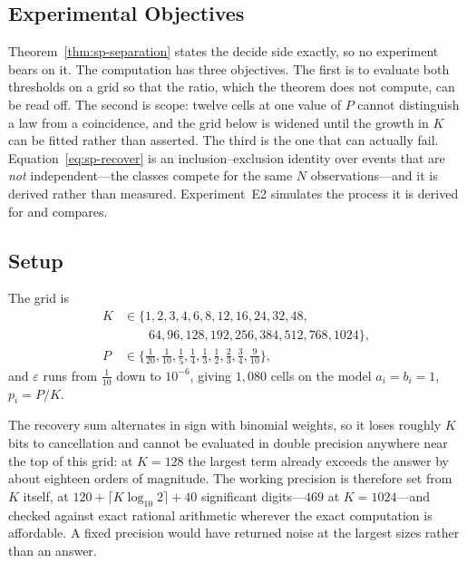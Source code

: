 \documentclass[conference]{IEEEtran}
\theoremstyle{definition}
\begin{document}
\subsection{Experimental Objectives}

Theorem~\ref{thm:sp-separation} states the decide side exactly, so no experiment bears on it. The
computation has three objectives. The first is to evaluate both thresholds on a grid so that
the ratio, which the theorem does not compute, can be read off. The second is scope: twelve
cells at one value of $P$ cannot distinguish a law from a coincidence, and the grid below is
widened until the growth in $K$ can be fitted rather than asserted. The third is the one that
can actually fail. Equation~\eqref{eq:sp-recover} is an inclusion--exclusion identity over events
that are \emph{not} independent---the classes compete for the same $N$ observations---and it
is derived rather than measured. Experiment~E2 simulates the process it is derived for and
compares.

\subsection{Setup}

The grid is
\begin{align*}
K &\in \{1,2,3,4,6,8,12,16,24,32,48,\\
  &\qquad 64,96,128,192,256,384,512,768,1024\},\\
P &\in \{\tfrac1{20},\tfrac1{10},\tfrac15,\tfrac14,\tfrac13,\tfrac12,\tfrac23,\tfrac34,\tfrac9{10}\},
\end{align*}
and $\varepsilon$ runs from $\tfrac1{10}$ down to $10^{-6}$, giving $1{,}080$ cells on the
model $a_{i}=b_{i}=1$, $p_{i}=P/K$.

The recovery sum alternates in sign with binomial weights, so it loses roughly $K$ bits to
cancellation and cannot be evaluated in double precision anywhere near the top of this grid:
at $K=128$ the largest term already exceeds the answer by about eighteen orders of magnitude.
The working precision is therefore set from $K$ itself, at
$120+\lceil K\log_{10}2\rceil+40$ significant digits---$469$ at $K=1024$---and checked
against exact rational arithmetic wherever the exact computation is affordable. A fixed
precision would have returned noise at the largest sizes rather than an answer.
\end{document}
